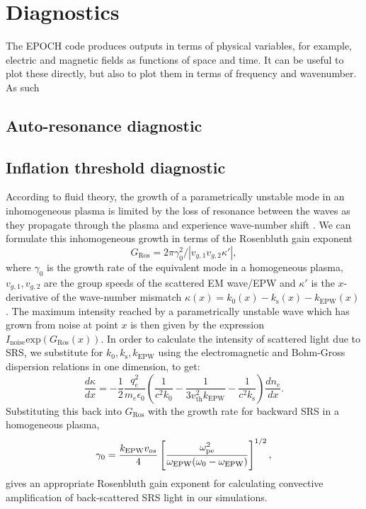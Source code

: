 \section{Diagnostics}

The EPOCH code produces outputs in terms of physical variables, for example, electric and magnetic fields as functions of space and time. It can be useful to plot these directly, but also to plot them in terms of frequency and wavenumber. As such

\subsection{Auto-resonance diagnostic}

\subsection{Inflation threshold diagnostic}\label{diag:threshold}
According to fluid theory, the growth of a parametrically unstable mode in an inhomogeneous plasma is limited by the loss of resonance between the waves as they propagate through the plasma and experience wave-number shift \cite{Rosenbluth1972}. We can formulate this inhomogeneous growth in terms of the Rosenbluth gain exponent\cite{Rosenbluth1972}
\begin{equation}\label{eqn:GRos}
    G_\mathrm{Ros} = 2\pi\gamma_0^2/|v_{g,1}v_{g,2}\kappa'|,
\end{equation}
where $\gamma_0$ is the growth rate of the equivalent mode in a homogeneous plasma, $v_{g,1}, v_{g,2}$ are the group speeds of the scattered EM wave/EPW and $\kappa'$ is the $x$-derivative of the wave-number mismatch $\kappa(x) = k_0(x) -k_\mathrm{s}(x) -k_\mathrm{EPW}(x)$. The maximum intensity reached by a parametrically unstable wave which has grown from noise at point $x$ is then given by the expression $I_\mathrm{noise}\mathrm{exp}(G_\mathrm{Ros}(x))$. In order to calculate the intensity of scattered light due to SRS, we substitute for $k_0,k_\mathrm{s},k_\mathrm{EPW}$ using the electromagnetic and Bohm-Gross dispersion relations in one dimension, to get:
\begin{equation}\label{eqn:kappaPrime}
    \frac{d\kappa}{dx}= -\frac{1}{2}\frac{q_e^2}{m_e\epsilon_0}
    \left(\frac{1}{c^2k_0}-\frac{1}{3v_\mathrm{th}^2k_\mathrm{EPW}}-\frac{1}{c^2k_\mathrm{s}}\right)\frac{dn_e}{dx}.
\end{equation}
Substituting this back into $G_\mathrm{Ros}$ with the growth rate for backward SRS in a homogeneous plasma\cite{kruer2003},
\begin{equation}\label{eqn:gamma0}
    \centering
    \gamma_0 = \frac{k_\mathrm{EPW}v_{os}}{4}\left[\frac{\omega_{\mathrm{pe}}^2}{\omega_\mathrm{EPW}(\omega_0-\omega_\mathrm{EPW})}\right]^{1/2},
\end{equation}
gives an appropriate Rosenbluth gain exponent for calculating convective amplification of
back-scattered SRS light in our simulations.


